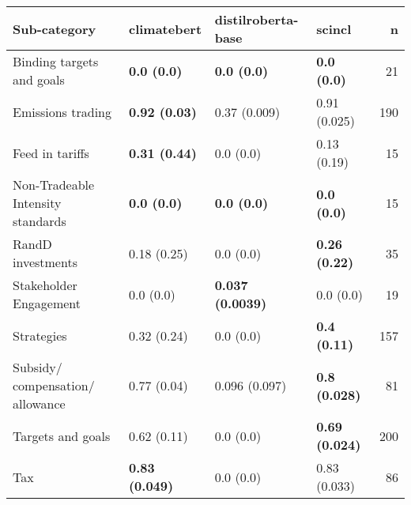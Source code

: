 \begin{tabular}{llllr}
\toprule
Sub-category & climatebert & distilroberta-base & scincl & n \\
\midrule
Binding targets and goals & \textbf{0.0 (0.0)} & \textbf{0.0 (0.0)} & \textbf{0.0 (0.0)} & 21 \\
Emissions trading & \textbf{0.92 (0.03)} & 0.37 (0.009) & 0.91 (0.025) & 190 \\
Feed in tariffs & \textbf{0.31 (0.44)} & 0.0 (0.0) & 0.13 (0.19) & 15 \\
Non-Tradeable Intensity standards & \textbf{0.0 (0.0)} & \textbf{0.0 (0.0)} & \textbf{0.0 (0.0)} & 15 \\
RandD investments & 0.18 (0.25) & 0.0 (0.0) & \textbf{0.26 (0.22)} & 35 \\
Stakeholder Engagement & 0.0 (0.0) & \textbf{0.037 (0.0039)} & 0.0 (0.0) & 19 \\
Strategies & 0.32 (0.24) & 0.0 (0.0) & \textbf{0.4 (0.11)} & 157 \\
Subsidy/ compensation/ allowance & 0.77 (0.04) & 0.096 (0.097) & \textbf{0.8 (0.028)} & 81 \\
Targets and goals & 0.62 (0.11) & 0.0 (0.0) & \textbf{0.69 (0.024)} & 200 \\
Tax & \textbf{0.83 (0.049)} & 0.0 (0.0) & 0.83 (0.033) & 86 \\
\bottomrule
\end{tabular}
